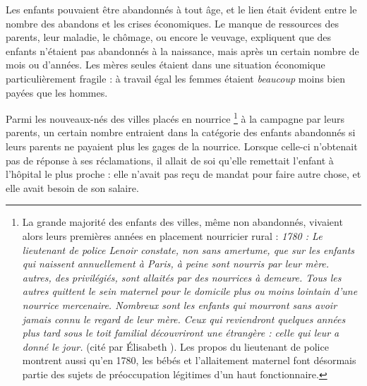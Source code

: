  Les enfants pouvaient être abandonnés à tout âge, et le lien était évident entre le nombre des abandons et les crises économiques. Le manque de ressources des parents, leur maladie, le chômage, ou encore le veuvage, expliquent que des enfants n'étaient pas abandonnés à la naissance, mais après un certain nombre de mois ou d'années. Les mères seules étaient dans une situation économique particulièrement fragile : à travail égal les femmes étaient \emph{beaucoup} moins bien payées que les hommes. 

 Parmi les nouveaux-nés des villes placés en nourrice 
\footnote{La grande majorité des enfants des villes, même non abandonnés, vivaient alors leurs premières années en placement nourricier rural : \emph{1780 : Le lieutenant de police Lenoir constate, non sans amertume, que sur les  enfants qui naissent annuellement à Paris,  à peine sont nourris par leur mère.  autres, des privilégiés, sont allaités par des nourrices à demeure. Tous les autres quittent le sein maternel pour le domicile plus ou moins lointain d'une nourrice mercenaire. Nombreux sont les enfants qui mourront sans avoir jamais connu le regard de leur mère. Ceux qui reviendront quelques années plus tard sous le toit familial découvriront une étrangère : celle qui leur a donné le jour.} (cité par Élisabeth ). Les propos du lieutenant de police montrent aussi qu'en 1780, les bébés et l'allaitement maternel font désormais partie des sujets de préoccupation légitimes d'un haut fonctionnaire.} 
à la campagne par leurs parents, un certain nombre entraient dans la catégorie des enfants abandonnés si leurs parents ne payaient plus les gages de la nourrice. Lorsque celle-ci n'obtenait pas de réponse à ses réclamations, il allait de soi qu'elle remettait l'enfant à l'hôpital le plus proche : elle n'avait pas reçu de mandat pour faire autre chose, et elle avait besoin de son salaire. 

 




